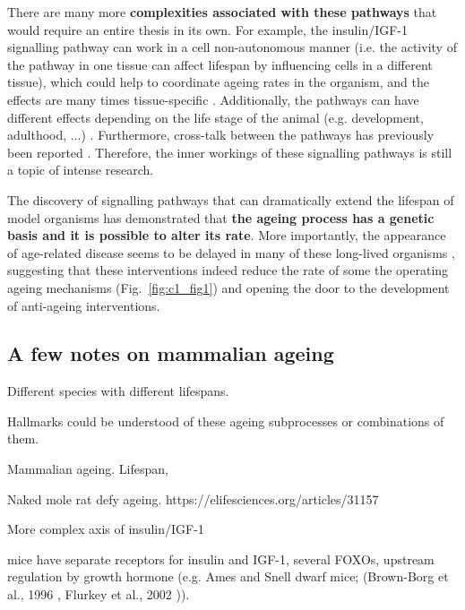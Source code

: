 \bigskip

There are many more \textbf{complexities associated with these pathways} that would require an entire thesis in its own. For example, the insulin/IGF-1 signalling pathway can work in a cell non-autonomous manner (i.e. the activity of the pathway in one tissue can affect lifespan by influencing cells in a different tissue), which could help to coordinate ageing rates in the organism, and the effects are many times tissue-specific \cite{Kenyon2005,Kenyon2010}. Additionally, the pathways can have different effects depending on the life stage of the animal (e.g. development, adulthood, ...) \cite{Dillin2002}. Furthermore, cross-talk between the pathways has previously been reported \cite{Bonkowski2016, Greer2007}. Therefore, the inner workings of these signalling pathways is still a topic of intense research.

\bigskip

The discovery of signalling pathways that can dramatically extend the lifespan of model organisms has demonstrated that \textbf{the ageing process has a genetic basis and it is possible to alter its rate}. More importantly, the appearance of age-related disease seems to be delayed in many of these long-lived organisms \cite{Kenyon2010,Arantes-Oliveira2003}, suggesting that these interventions indeed reduce the rate of some the operating ageing mechanisms (Fig.~\ref{fig:c1_fig1}) and opening the door to the development of anti-ageing interventions. 

\smallskip

\subsection{A few notes on mammalian ageing}

\smallskip


Different species with different lifespans. 

Hallmarks could be understood of these ageing subprocesses or combinations of them.  


Mammalian ageing. Lifespan, 


Naked mole rat defy ageing. https://elifesciences.org/articles/31157


More complex axis of insulin/IGF-1 \cite{Kenyon2010}

mice have separate receptors for insulin and IGF-1, several FOXOs, upstream regulation by growth hormone (e.g. Ames and Snell dwarf mice; (Brown-Borg et al., 1996
, Flurkey et al., 2002
)).

